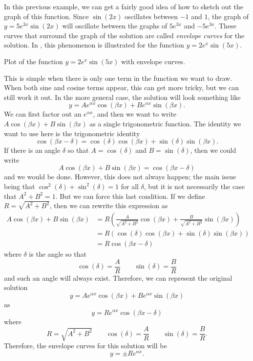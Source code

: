 \documentclass{ximera}
\begin{document}
In this previous example, we can get a fairly good idea of how to sketch out the graph of this function. Since $\sin(2x)$ oscillates between $-1$ and $1$, the graph of $y = 5e^{3x}\sin(2x)$ will oscillate between the graphs of $5e^{3x}$ and $-5e^{3x}$. These curves that surround the graph of the solution are called \emph{envelope curves} for the solution. In , this phenomenon is illustrated for the function $y = 2e^x\sin(5x)$.

\begin{myfig}
    \capstart
    \caption{Plot of the function $y=2e^x \sin(5x)$ with envelope curves. \label{envelope:fig}}
\end{myfig}

This is simple when there is only one term in the function we want to draw. When both sine and cosine terms appear, this can get more tricky, but we can still work it out. In the more general case, the solution will look something like
\[ 
    y = Ae^{\alpha x}\cos(\beta x) + B e^{\alpha x} \sin(\beta x). 
\] 
We can first factor out an $e^{\alpha x}$, and then we want to write $A \cos(\beta x) + B \sin(\beta x)$ as a single trigonometric function.  The identity we want to use here is the trigonometric identity
\[ 
    \cos(\beta x - \delta) = \cos(\delta) \cos(\beta x) + \sin(\delta) \sin(\beta x). 
\] 
If there is an angle $\delta$ so that $A = \cos(\delta)$ and $B = \sin(\delta)$, then we could write
\[  
    A \cos(\beta x) + B \sin(\beta x) = \cos(\beta x - \delta) 
\] 
and we would be done. However, this does not always happen; the main issue being that $\cos^2(\delta) + \sin^2(\delta) = 1$ for all $\delta$, but it is not necessarily the case that $A^2 + B^2 = 1$. But we can force this last condition. If we define $R = \sqrt{A^2 + B^2}$, then we can rewrite this expression as
\[
    \begin{split}
        A \cos(\beta x) + B \sin(\beta x) &= R \left( \frac{A}{\sqrt{A^2 + B^2}} \cos(\beta x) + \frac{B}{\sqrt{A^2 + B^2}}\sin(\beta x)\right) \\
        &= R \left( \cos(\delta) \cos(\beta x) + \sin(\delta) \sin(\beta x) \right) \\
        &= R \cos(\beta x - \delta)
    \end{split}
\]
where $\delta$ is the angle so that
\[ 
\cos(\delta) = \frac{A}{R} \qquad \sin(\delta) = \frac{B}{R} 
\] 
and such an angle will always exist. Therefore, we can represent the original solution 
\[
    y = Ae^{\alpha x}\cos(\beta x) + B e^{\alpha x} \sin(\beta x) 
\] 
as 
\[ 
    y = Re^{\alpha x}\cos(\beta x - \delta) 
\] 
where
\[ 
    R = \sqrt{A^2 + B^2} \qquad \cos(\delta) = \frac{A}{R} \qquad \sin(\delta) = \frac{B}{R}. 
\] 
Therefore, the envelope curves for this solution will be 
\[ 
    y = \pm Re^{\alpha x}. 
\]
\end{document}

